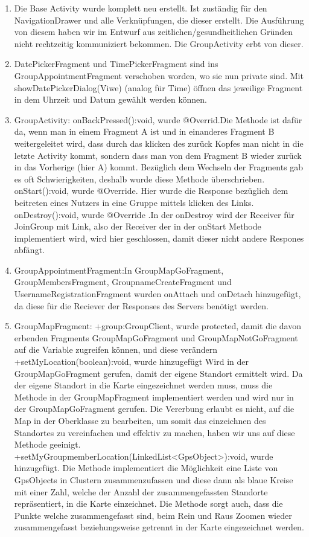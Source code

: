 \begin{enumerate}
	\item Die Base Activity wurde komplett neu erstellt. Ist zuständig für den NavigationDrawer und alle Verknüpfungen, die dieser erstellt. Die Ausführung von diesem haben wir im Entwurf aus zeitlichen/gesundheitlichen Gründen nicht rechtzeitig kommuniziert bekommen. Die GroupActivity erbt von dieser.
	\item DatePickerFragment und TimePickerFragment sind ins GroupAppointmentFragment verschoben worden, wo sie nun private sind. Mit showDatePickerDialog(Viwe) (analog für Time) öffnen das jeweilige Fragment in dem Uhrzeit und Datum gewählt werden können.	
	\item GroupActivity: onBackPressed():void, wurde @Overrid.Die Methode ist dafür da, wenn man in einem Fragment A ist und in einanderes Fragment B weitergeleitet wird, dass durch das klicken des zurück Kopfes man nicht in die letzte Activity kommt, sondern dass man von dem Fragment B wieder zurück in das Vorherige (hier A) kommt. Bezüglich dem Wechseln der Fragments gab es oft Schwierigkeiten, deshalb wurde diese Methode überschrieben. onStart():void, wurde @Override. Hier wurde die Response bezüglich dem beitreten eines Nutzers in eine Gruppe mittels klicken des Links.  onDestroy():void, wurde @Override .In der onDestroy wird der Receiver für JoinGroup mit Link, also der Receiver der in der onStart Methode implementiert wird, wird hier geschlossen, damit dieser nicht andere Respones abfängt.
	\item GroupAppointmentFragment:In GroupMapGoFragment, GroupMembersFragment, GroupnameCreateFragment und UsernameRegistrationFragment wurden onAttach und onDetach hinzugefügt, da diese für die Reciever der Responses des Servers benötigt werden.
	\item GroupMapFragment: +group:GroupClient, wurde protected, damit die davon erbenden Fragments GroupMapGoFragment und GroupMapNotGoFragment auf die Variable zugreifen können, und diese verändern
	+setMyLocation(boolean):void, wurde hinzugefügt Wird in der GroupMapGoFragment gerufen, damit der eigene Standort ermittelt wird. Da der eigene Standort in die Karte eingezeichnet werden muss, muss die Methode in der GroupMapFragment implementiert werden und wird nur in der GroupMapGoFragment gerufen. Die Vererbung erlaubt es nicht, auf die Map in der Oberklasse zu bearbeiten, um somit das einzeichnen des Standortes zu vereinfachen und effektiv zu machen, haben wir uns auf diese Methode geeinigt. 
	+setMyGroupmemberLocation(LinkedList<GpsObject>):void, wurde hinzugefügt. Die Methode implementiert die Möglichkeit eine Liste von GpsObjects in Clustern zusammenzufassen und diese dann als blaue Kreise mit einer Zahl, welche der Anzahl der zusammengefassten Standorte repräsentiert, in die Karte einzeichnet. Die Methode sorgt auch, dass die Punkte welche zusammengefasst sind, beim Rein und Raus Zoomen wieder zusammengefasst beziehungsweise getrennt in der Karte eingezeichnet werden.

\end{enumerate}
